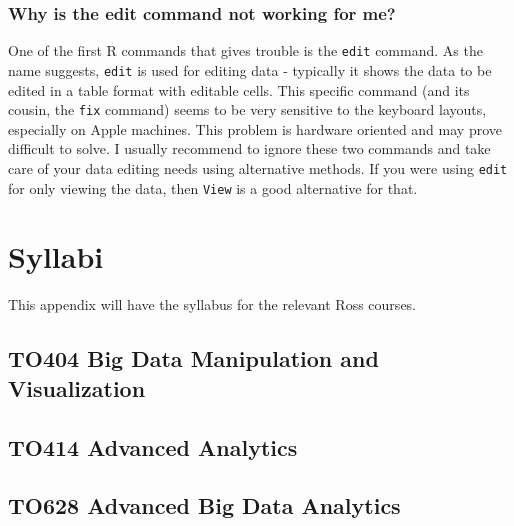 \documentclass[]{krantz}
\theoremstyle{definition}
\theoremstyle{definition}
\theoremstyle{definition}
\theoremstyle{remark}
\begin{document}
\subsection{Why is the edit command not working for
me?}\label{why-is-the-edit-command-not-working-for-me}

One of the first R commands that gives trouble is the \texttt{edit}
command. As the name suggests, \texttt{edit} is used for editing data -
typically it shows the data to be edited in a table format with editable
cells. This specific command (and its cousin, the \texttt{fix} command)
seems to be very sensitive to the keyboard layouts, especially on Apple
machines. This problem is hardware oriented and may prove difficult to
solve. I usually recommend to ignore these two commands and take care of
your data editing needs using alternative methods. If you were using
\texttt{edit} for only viewing the data, then \texttt{View} is a good
alternative for that.

\cleardoublepage 

\appendix {}


\chapter{Syllabi}\label{syllabi}

This appendix will have the syllabus for the relevant Ross courses.

\section{TO404 Big Data Manipulation and
Visualization}\label{to404-big-data-manipulation-and-visualization}

\section{TO414 Advanced Analytics}\label{to414-advanced-analytics}

\section{TO628 Advanced Big Data
Analytics}\label{to628-advanced-big-data-analytics}



\backmatter
\printindex
\end{document}

